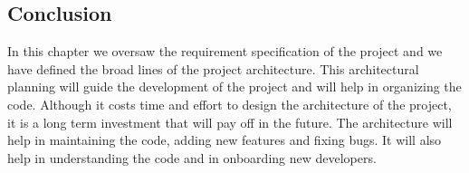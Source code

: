 \begin{spacing}{1.2}
    \section*{Conclusion}
    In this chapter we oversaw the requirement specification of the project and we have 
    defined the broad lines of the project architecture. This architectural planning 
    will guide the development of the project and will help in organizing the code. 
    Although it costs time and effort to design the architecture of the project, it is 
    a long term investment that will pay off in the future. The architecture will help
    in maintaining the code, adding new features and fixing bugs. It will also help in
    understanding the code and in onboarding new developers.\\





\end{spacing}
